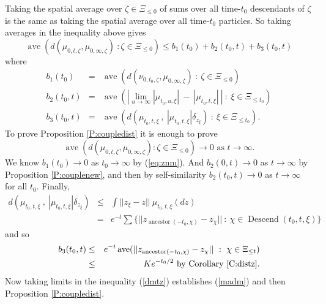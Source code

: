 \documentclass[12pt]{article}
\DeclareMathOperator{\ave}{ave}
\DeclareMathOperator{\ancestor}{ancestor}
\DeclareMathOperator{\descend}{Descend}
\begin{document}
Taking the spatial average over $\zeta \in \Xi_{\le 0}$ of sums over all time-$t_0$ descendants of $\zeta$ is the same as 
taking the spatial average over all time-$t_0$ particles. 
So taking averages in the inequality above gives
\begin{equation}
\ave ( d(\mu_{0,t,\zeta} , \mu_{0, \infty, \zeta}) \ : \zeta \in \Xi_{\le 0} )   \le b_1(t_0) + b_2(t_0,t) + b_3(t_0,t) 
\label{dmtz}
\end{equation}
where
\begin{eqnarray*} 
b_1(t_0) &=& \ave ( d(\nu_{0,t_0,\zeta} , \mu_{0, \infty, \zeta})  \ : \ \zeta \in \Xi_{\le 0} ) 
\\
b_2(t_0,t) &=&
 \ave \left( \left|   \lim_{u \to \infty} |\mu_{t_0,u,\xi}| \ - \ | \mu_{t_0,t,\xi}| \ \right| \ : \ \xi \in \Xi_{\le t_0} \right)
\\
b_3(t_0,t) &=&
 \ave ( d( \mu_{t_0,t,\xi} \ , \ |\mu_{t_0,t,\xi}| \delta_{z_\xi}) \ : \ \xi \in \Xi_{\le t_0} ) .
\end{eqnarray*}
To prove Proposition \ref{P:coupledist} it is enough to prove
\begin{equation}
\mbox{$\ave ( d(\mu_{0,t,\zeta} , \mu_{0, \infty, \zeta}) : \zeta \in \Xi_{\le 0} ) \to 0$ as $t \to \infty$.}
\label{madm}
\end{equation}
We know $b_1(t_0) \to 0$ as $t_0 \to \infty$ by (\ref{eq:znm}). 
And $b_2(0,t) \to 0$ as $t \to \infty$ by Proposition \ref{P:couplenew},
and then by self-similarity $b_2(t_0,t) \to 0$ as $t \to \infty$ for all $t_0$.
Finally,
\begin{eqnarray*}
d( \mu_{t_0,t,\xi} \ , \ |\mu_{t_0,t,\xi}| \delta_{z_\xi}) 
& \le &
\int || z_\xi - z|| \ \mu_{t_0,t,\xi}(dz) \\
&=&  e^{-t} \sum \{ ||z_{\ancestor(-t_0, \chi)} - z_\chi || \ : \ \chi \in \descend(t_0,t,\xi) \}
\end{eqnarray*}
and so 
\begin{eqnarray*}
 b_3(t_0,t) &\le&
e^{-t} \ave ( ||z_{\ancestor(-t_0, \chi)} - z_\chi || \ : \ \chi \in \Xi_{\le t} ) \\
& \le  & K e^{-t_0/2} \mbox{ by Corollary \ref{C:distz}}. 
\end{eqnarray*}
Now taking limits in the inequality (\ref{dmtz}) establishes (\ref{madm}) and then Proposition \ref{P:coupledist}.
\end{document}
